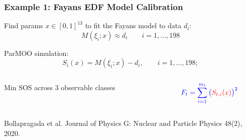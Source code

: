 \documentclass[aspectratio=169]{beamer}
\begin{document}
\begin{frame}\frametitle{Example 1: Fayans EDF Model Calibration}
Find params $x \in [0, 1]^{13}$ to fit the Fayans model to data $d_i$:
$$
M\left(\xi_{i};x\right) \approx d_{i} \qquad i=1,\ldots, 198
$$

\medskip

ParMOO simulation:
$$
S_{i}(x) = M\left(\xi_{i};x\right) - d_{i},
\qquad i=1,\ldots, 198;
$$

\medskip

\begin{columns}
\begin{column}{0.65\textwidth}
Min SOS across 3 observable classes
\end{column}
\begin{column}{0.35\textwidth}
$$
{\color{blue}F_t = \sum_{i=1}^{m_t}\big({\color{red}S_{t,i}(x)}\big)^2}
$$
\end{column}
\end{columns}

\vfill

{\small
Bollapragada et al. Journal of Physics G: Nuclear and Particle Physics 48(2), 2020.}\par
\end{frame}
\end{document}
